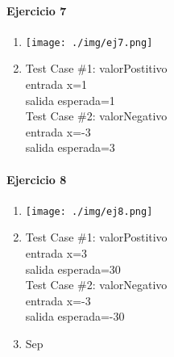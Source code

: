 \documentclass{article}
\begin{document}
\paragraph{Ejercicio 7}

\begin{multicols}{2}
\begin{enumerate}
\item \texttt{[image: ./img/ej7.png]}
\item	
Test Case \#1: valorPostitivo\\
\hspace*{6mm}entrada x=1\\
\hspace*{6mm}salida esperada=1\medskip\\
Test Case \#2: valorNegativo\\
\hspace*{6mm}entrada x=-3\\
\hspace*{6mm}salida esperada=3\medskip\\
\end{enumerate}
\end{multicols}

\paragraph{Ejercicio 8}

\begin{multicols}{2}
\begin{enumerate}
\item \texttt{[image: ./img/ej8.png]}
\item	
Test Case \#1: valorPostitivo\\
\hspace*{6mm}entrada x=3\\
\hspace*{6mm}salida esperada=30\medskip\\
Test Case \#2: valorNegativo\\
\hspace*{6mm}entrada x=-3\\
\hspace*{6mm}salida esperada=-30\medskip\\
\item Sep
\end{enumerate}
\end{multicols}
\end{document}

